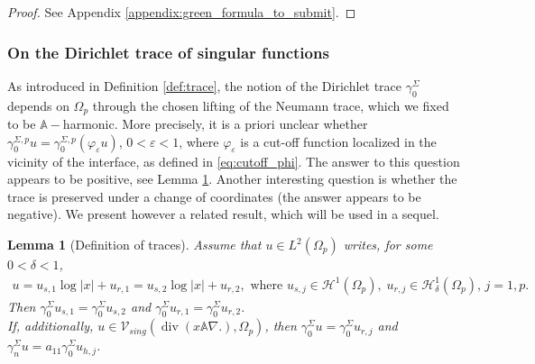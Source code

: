 \documentclass[report]{elsarticle}
\newtheorem{lemma}[theorem]{Lemma}
\numberwithin{theorem}{section}
\newcommand{\re}{\varepsilon}
\begin{document}
\begin{proof}
	See Appendix \ref{appendix:green_formula_to_submit}.
\end{proof}

\subsubsection{On the Dirichlet trace of singular functions}
As introduced in Definition \ref{def:trace}, the notion of the Dirichlet trace $\gamma_0^{\Sigma}$ depends on $\Omega_p$ through the chosen lifting of the Neumann trace, which we fixed to be $\mathbb{A}-$harmonic. More precisely, it is a priori unclear whether  $\gamma_0^{\Sigma,p}u=\gamma_0^{\Sigma,p}(\varphi_{\re}u)$, $0<\re<1$, where $\varphi_{\re}$ is a cut-off function localized in the vicinity of the interface, as defined in \eqref{eq:cutoff_phi}. The answer to this question appears to be positive, see Lemma \ref{lem:deftraces}. Another interesting question is whether the trace is preserved under a change of coordinates (the answer appears to be negative). We present however a related result, which will be used in a sequel. 
\begin{lemma}[Definition of traces]
	\label{lem:deftraces}
	Assume that $u\in L^2(\Omega_p)$ writes, for some $0<\delta<1$, 
	\begin{align*}
		u=u_{s,1}\log|x|+u_{r,1}=u_{s,2}\log|x|+u_{r,2}, \text{ where }u_{s,j}\in \mathcal{H}^1(\Omega_p), \; u_{r,j}\in \mathcal{H}^1_{\delta}(\Omega_p),\, j=1,p.
	\end{align*}
	Then  $\gamma_0^{\Sigma}u_{s,1}=\gamma_0^{\Sigma}u_{s,2}$ and  $\gamma_0^{\Sigma}u_{r,1}=\gamma_0^{\Sigma}u_{r,2}.$\\
	If, additionally, $u\in \mathcal{V}_{sing}(\operatorname{div}(x\mathbb{A}\nabla.), \Omega_p)$, then  $\gamma_0^{\Sigma}u=\gamma_0^{\Sigma}u_{r,j}$ and $\gamma_n^{\Sigma}u=a_{11}\gamma_0^{\Sigma}u_{h,j}$. 
\end{lemma}
\end{document}
